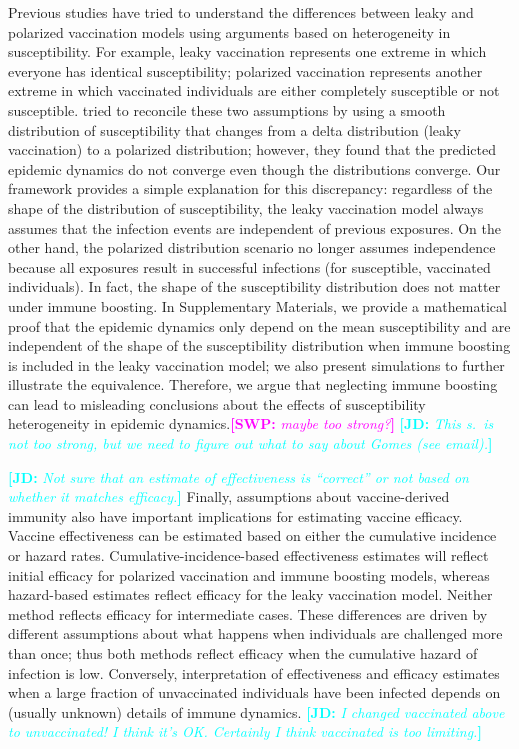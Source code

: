 \documentclass[12pt]{article}
\newcommand{\comment}{\showcomment}
\newcommand{\showcomment}[3]{\textcolor{#1}{\textbf{[#2: }\textsl{#3}\textbf{]}}}
\newcommand{\jd}[1]{\comment{cyan}{JD}{#1}}
\newcommand{\swp}[1]{\comment{magenta}{SWP}{#1}}
\begin{document}
Previous studies have tried to understand the differences between leaky and polarized vaccination models using arguments based on heterogeneity in susceptibility.
For example, leaky vaccination represents one extreme in which everyone has identical susceptibility;
polarized vaccination represents another extreme in which vaccinated individuals are either completely susceptible or not susceptible.
\cite{gomes2014missing} tried to reconcile these two assumptions by using a smooth distribution of susceptibility that changes from a delta distribution (leaky vaccination) to a polarized distribution;
however, they found that the predicted epidemic dynamics do not converge even though the distributions converge.
Our framework provides a simple explanation for this discrepancy:
regardless of the shape of the distribution of susceptibility, the leaky vaccination model always assumes that the infection events are independent of previous exposures.
On the other hand, the polarized distribution scenario no longer assumes independence because all exposures result in successful infections (for susceptible, vaccinated individuals).
In fact, the shape of the susceptibility distribution does not matter under immune boosting.
In Supplementary Materials, we provide a mathematical proof that the epidemic dynamics only depend on the mean susceptibility and are independent of the shape of the susceptibility distribution when immune boosting is included in the leaky vaccination model; we also present simulations to further illustrate the equivalence.
Therefore, we argue that neglecting immune boosting can lead to misleading conclusions about the effects of susceptibility heterogeneity in epidemic dynamics.\swp{maybe too strong?}
\jd{This s.~is not too strong, but we need to figure out what to say about Gomes (see email).}

\jd{Not sure that an estimate of effectiveness is “correct” or not based on whether it matches efficacy.}
Finally, assumptions about vaccine-derived immunity also have important implications for estimating vaccine efficacy.
Vaccine effectiveness can be estimated based on either the cumulative incidence or hazard rates.
Cumulative-incidence-based effectiveness estimates will reflect initial efficacy for polarized vaccination and immune boosting models,
whereas hazard-based estimates reflect efficacy for the leaky vaccination model.
Neither method reflects efficacy for intermediate cases.
These differences are driven by different assumptions about what happens when individuals are challenged more than once; thus both methods reflect efficacy when the cumulative hazard of infection is low. 
Conversely, interpretation of effectiveness and efficacy estimates when a large fraction of unvaccinated individuals have been infected depends on (usually unknown) details of immune dynamics.
\jd{I changed vaccinated above to unvaccinated! I think it's OK. Certainly I think vaccinated is too limiting.}
\end{document}
